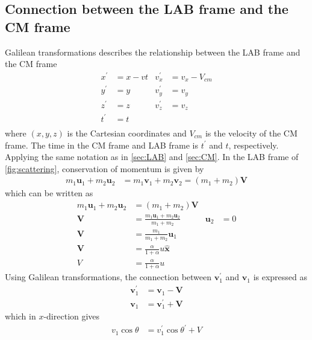 \documentclass[twoside,english]{uiofysmaster/uiofysmaster}
\let\orgautoref\autoref
\renewcommand{\autoref}
        {%
		 \def\sectionautorefname{Section}%
		 \def\subsectionautorefname{Section}%
		 \def\subsubsectionautorefname{Section}%
		 \def\chapterautorefname{Chapter}%
          \orgautoref}
\begin{document}
\begin{appendices}
\section{Connection between the LAB frame and the CM frame}\label{sec:LAB_CM_connection}
Galilean transformations describes the relationship between the LAB frame and the CM frame
\begin{align*}
	 x^{'} &= x - vt  & v_x^{'} &= v_x - V_{cm} \\
	 y^{'} &= y & v_y^{'} &= v_y \\
	 z^{'} &= z & v_z^{'} &= v_z \\
	 t^{'} &= t \\
\end{align*}
where $(x, y, z)$ is the Cartesian coordinates and $V_{cm}$ is the velocity of the CM frame. 
The time in the CM frame and LAB frame is $t^{'}$ and $t$, respectively.
Applying the same notation as in \autoref{sec:LAB} and \autoref{sec:CM}.
In the LAB frame of \autoref{fig:scattering}, conservation of momentum is given by
\begin{align}\label{eq:comlab}
	m_1 \boldsymbol{u}_1 + m_2 \boldsymbol{u}_2 &= m_1 \boldsymbol{v}_1 + m_2 \boldsymbol{v}_2 = (m_1 + m_2)\boldsymbol{V}
\end{align}
which can be written as
\begin{align}\label{eq:V}
	m_1 \boldsymbol{u}_1 + m_2 \boldsymbol{u}_2 &= (m_1 + m_2)\boldsymbol{V} \nonumber\\
	\boldsymbol{V} &= \frac{m_1 \boldsymbol{u}_1 + m_2 \boldsymbol{u}_2}{m_1 + m_2} & \boldsymbol{u}_2& = 0 \nonumber\\
	\boldsymbol{V} &= \frac{m_1}{m_1 + m_2} \boldsymbol{u}_1 \nonumber\\
	\boldsymbol{V} &= \frac{\alpha}{1 + \alpha} u \boldsymbol{\hat{x}} \nonumber\\
	V &= \frac{\alpha}{1 + \alpha} u
\end{align}
Using Galilean transformations, the connection between $\boldsymbol{v}_1^{'}$ and $\boldsymbol{v}_1$ is expressed as
\begin{align}\label{eq:vcmv}
	\boldsymbol{v}_1^{'} &= \boldsymbol{v}_1 - \boldsymbol{V} \nonumber\\
	\boldsymbol{v}_1 &= \boldsymbol{v}_1^{'} + \boldsymbol{V}
\end{align}
which in $x$-direction gives
\begin{align}\label{eq:vcmvx}
	v_1 \cos \theta &= v_1^{'} \cos \theta^{'} + V
\end{align}

\end{appendices}
\end{document}
